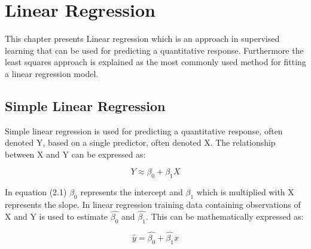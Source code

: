 \chapter{Linear Regression}
\label{chp:linreg}


This chapter presents Linear regression which is an approach in supervised learning that can be used for predicting a quantitative response. Furthermore the least squares approach is explained as the most commonly used method for fitting a linear regression model.

\section{Simple Linear Regression}

Simple linear regression is used for predicting a quantitative response, often denoted Y, based on a single predictor, often denoted X.
The relationship between X and Y can be expressed as:

\begin{equation}
Y \approx \beta_0 + \beta_1X
\end{equation}

In equation (2.1) $\beta_0$ represents the intercept and $\beta_1$ which is multiplied with X represents the slope.
In linear regression training data containing observations of X and Y is used to estimate $\hat{\beta_0}$ and $\hat{\beta_1}$. 
This can be mathematically expressed as:

\begin{equation}
\hat{y} = \hat{\beta_0} + \hat{\beta_1}x
\end{equation}

